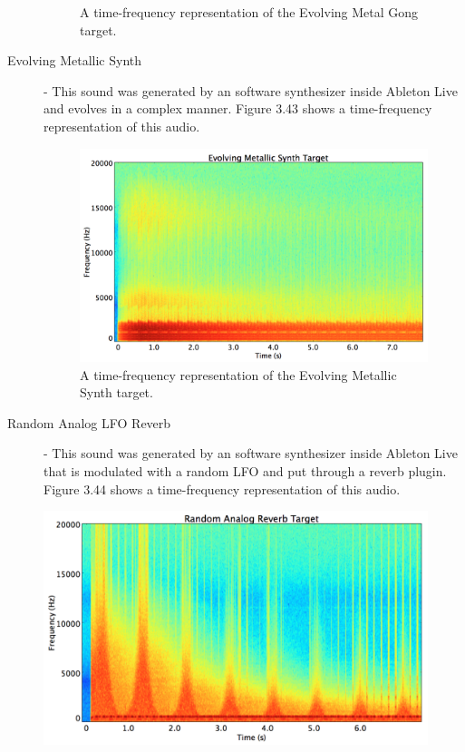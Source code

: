 \documentclass[a4paper,12pt]{report} 	%
\numberwithin{figure}{chapter}
\numberwithin{table}{chapter}
\numberwithin{equation}{chapter}
\begin{document}
\begin{flushleft}
\begin{description}
\begin{figure}[h!]
\begin{center}
\caption[Evolving Metal Gong Time-Frequency Representation]{A time-frequency representation of the Evolving Metal Gong target.}
\end{center}
\end{figure}
\item[Evolving Metallic Synth] - This sound was generated by an software synthesizer inside Ableton Live and evolves in a complex manner. Figure 3.43 shows a time-frequency representation of this audio.
\begin{figure}[h!]
\begin{center}
\includegraphics[scale=0.35,width=\linewidth]{EvolvingMetallicSynthTargetSTFT}
\caption[Evolving Metallic Synth Time-Frequency Representation]{A time-frequency representation of the Evolving Metallic Synth target.}
\end{center}
\end{figure}
\item[Random Analog LFO Reverb] - This sound was generated by an software synthesizer inside Ableton Live that is modulated with a random LFO and put through a reverb plugin. Figure 3.44 shows a time-frequency representation of this audio.
\end{description}
\begin{figure}[h!]
\begin{center}
\includegraphics[scale=0.35,width=\linewidth]{RandomAnalogReverbTargetSTFT}

\end{center}
\end{figure}
\end{flushleft}
\end{document}
